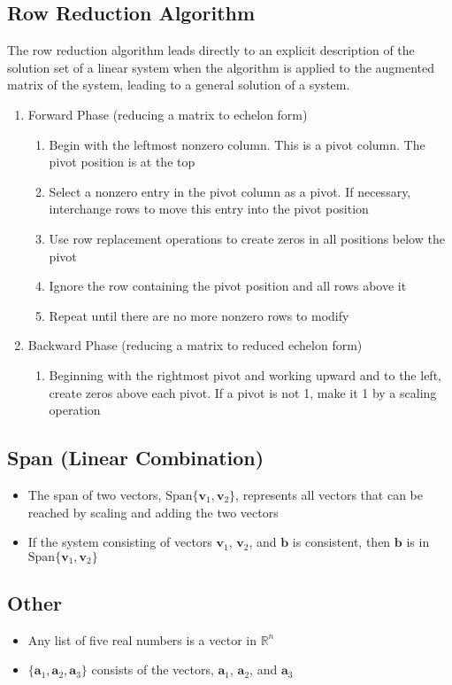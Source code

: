 \documentclass{article}
\begin{document}
\subsection*{Row Reduction Algorithm}
The row reduction algorithm leads directly to an explicit description of the solution set of a
linear system when the algorithm is applied to the augmented matrix of the system, leading to a
general solution of a system.
\begin{enumerate}
    \item Forward Phase (reducing a matrix to echelon form)
    \begin{enumerate}
        \item Begin with the leftmost nonzero column. This is a pivot column. The pivot position is
        at the top
        \item Select a nonzero entry in the pivot column as a pivot. If necessary, interchange rows
        to move this entry into the pivot position
        \item Use row replacement operations to create zeros in all positions below the pivot
        \item Ignore the row containing the pivot position and all rows above it
        \item Repeat until there are no more nonzero rows to modify    
    \end{enumerate}
    \item Backward Phase (reducing a matrix to reduced echelon form)
    \begin{enumerate}
        \item Beginning with the rightmost pivot and working upward and to the left, create zeros
        above each pivot. If a pivot is not 1, make it 1 by a scaling operation
    \end{enumerate}
\end{enumerate}

\subsection*{Span (Linear Combination)}
\begin{itemize}
    \item The span of two vectors, $\text{Span}\{\mathbf{v}_1, \mathbf{v}_2\}$, represents all
    vectors that can be reached by scaling and adding the two vectors
    \item If the system consisting of vectors $\mathbf{v}_1$, $\mathbf{v}_2$, and $\mathbf{b}$ is
    consistent, then $\mathbf{b}$ is in $\text{Span}\{\mathbf{v}_1, \mathbf{v}_2\}$
\end{itemize}

\subsection*{Other}
\begin{itemize}
    \item Any list of five real numbers is a vector in $\mathbb{R}^n$
    \item $\{\mathbf{a}_1, \mathbf{a}_2, \mathbf{a}_3\}$ consists of the vectors, $\mathbf{a}_1$,
    $\mathbf{a}_2$, and $\mathbf{a}_3$
\end{itemize}
\end{document}
